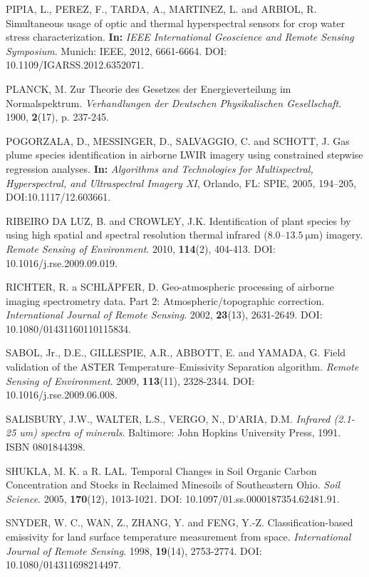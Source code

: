 \begin{thebibliography}{10}
 PIPIA, L., PEREZ, F., TARDA, A., MARTINEZ, L. and ARBIOL, R. Simultaneous usage of optic and thermal hyperspectral sensors for crop water stress characterization. \textbf{In:} \textit{IEEE International Geoscience and Remote Sensing Symposium}. Munich: IEEE, 2012, 6661-6664. DOI: 10.1109/IGARSS.2012.6352071. 

 PLANCK, M. Zur Theorie des Gesetzes der Energieverteilung im Normalspektrum. \textit{Verhandlungen der Deutschen Physikalischen Gesellschaft}. 1900, \textbf{2}(17), p. 237-245.

 POGORZALA, D., MESSINGER, D., SALVAGGIO, C. and SCHOTT, J. Gas plume species identification in airborne LWIR imagery using constrained stepwise regression analyses. \textbf{In:} \textit{Algorithms and Technologies for Multispectral, Hyperspectral, and Ultraspectral Imagery XI}, Orlando, FL: SPIE, 2005, 194–205, DOI:10.1117/12.603661.

 RIBEIRO DA LUZ, B. and CROWLEY, J.K. Identification of plant species by using high spatial and spectral resolution thermal infrared (8.0–$\SI{13.5}{\micro\meter}$) imagery. \textit{Remote Sensing of Environment}. 2010, \textbf{114}(2), 404-413. DOI: 10.1016/j.rse.2009.09.019.

 RICHTER, R. a SCHLÄPFER, D. Geo-atmospheric processing of airborne imaging spectrometry data. Part 2: Atmospheric/topographic correction. \textit{International Journal of Remote Sensing}. 2002, \textbf{23}(13), 2631-2649. DOI: 10.1080/01431160110115834.

 SABOL, Jr., D.E., GILLESPIE, A.R., ABBOTT, E. and YAMADA, G. Field validation of the ASTER Temperature–Emissivity Separation algorithm. \textit{Remote Sensing of Environment}. 2009, \textbf{113}(11), 2328-2344. DOI: 10.1016/j.rse.2009.06.008.

 SALISBURY, J.W., WALTER, L.S., VERGO, N., D'ARIA, D.M. \textit{Infrared (2.1-25 um) spectra of minerals}. Baltimore: John Hopkins University Press, 1991. ISBN 0801844398.

 SHUKLA, M. K. a R. LAL. Temporal Changes in Soil Organic Carbon Concentration and Stocks in Reclaimed Minesoils of Southeastern Ohio. \textit{Soil Science}. 2005, \textbf{170}(12), 1013-1021. DOI: 10.1097/01.ss.0000187354.62481.91.

 SNYDER, W. C., WAN, Z., ZHANG, Y. and FENG, Y.-Z. Classification-based emissivity for land surface temperature measurement from space. \textit{International Journal of Remote Sensing}. 1998, \textbf{19}(14), 2753-2774. DOI: 10.1080/014311698214497.


\end{thebibliography}
